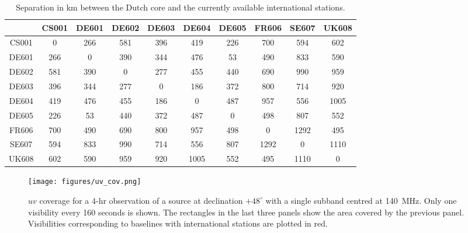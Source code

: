 \documentclass[graybox]{svmult}
\begin{document}
\begin{table}[h]
\centering
\begin{tabular}{cccccccccc}
\hline
\hline
      & CS001& DE601& DE602& DE603& DE604& DE605& FR606& SE607& UK608\\
\hline
 CS001&     0&   266&   581&   396&   419&   226&   700&   594&   602 \\
 DE601&   266&     0&   390&   344&   476&    53&   490&   833&   590 \\
 DE602&   581&   390&     0&   277&   455&   440&   690&   990&   959 \\
 DE603&   396&   344&   277&     0&   186&   372&   800&   714&   920 \\
 DE604&   419&   476&   455&   186&     0&   487&   957&   556&  1005 \\
 DE605&   226&    53&   440&   372&   487&     0&   498&   807&   552 \\
 FR606&   700&   490&   690&   800&   957&   498&     0&  1292&   495 \\
 SE607&   594&   833&   990&   714&   556&   807&  1292&     0&  1110 \\
 UK608&   602&   590&   959&   920&  1005&   552&   495&  1110&     0 \\
\hline
\end{tabular}
\caption{Separation in km between the Dutch core and the currently available
international stations.
\label{tab:baselines}}
\end{table}

\begin{figure}[t]
\begin{center}
\texttt{[image: figures/uv\_cov.png]}
\caption{$uv$ coverage for a 4-hr observation of a source at declination
$+48^{\circ}$ with a single subband centred at 140~MHz. Only one visibility every 160 seconds is shown. The rectangles in the last three panels show the area covered by the previous panel. Visibilities corresponding to baselines with international
stations are plotted in red.}
\label{fig:uvcoverage}
\end{center}
\end{figure}
\end{document}
